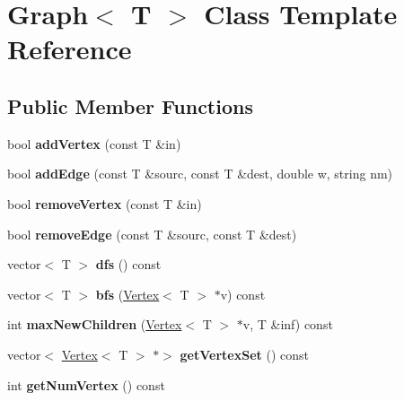 \hypertarget{class_graph}{}\section{Graph$<$ T $>$ Class Template Reference}
\label{class_graph}
\subsection*{Public Member Functions}
\begin{DoxyCompactItemize}
\item 
\hypertarget{class_graph_a00be284ea2be3b3d0f0d2e493b70245b}{}\label{class_graph_a00be284ea2be3b3d0f0d2e493b70245b} 
bool {\bfseries add\+Vertex} (const T \&in)
\item 
\hypertarget{class_graph_a09a8a2a77ce797e8be27364704a721ac}{}\label{class_graph_a09a8a2a77ce797e8be27364704a721ac} 
bool {\bfseries add\+Edge} (const T \&sourc, const T \&dest, double w, string nm)
\item 
\hypertarget{class_graph_af9c903104ad69a7782979fa9caedf163}{}\label{class_graph_af9c903104ad69a7782979fa9caedf163} 
bool {\bfseries remove\+Vertex} (const T \&in)
\item 
\hypertarget{class_graph_a1106092a37366486cf55576f9ec01692}{}\label{class_graph_a1106092a37366486cf55576f9ec01692} 
bool {\bfseries remove\+Edge} (const T \&sourc, const T \&dest)
\item 
\hypertarget{class_graph_a911798b1a89f8c4ae90ba3eee849cff8}{}\label{class_graph_a911798b1a89f8c4ae90ba3eee849cff8} 
vector$<$ T $>$ {\bfseries dfs} () const
\item 
\hypertarget{class_graph_a56a5ea2c3aa7c0bd3849849be404a631}{}\label{class_graph_a56a5ea2c3aa7c0bd3849849be404a631} 
vector$<$ T $>$ {\bfseries bfs} (\hyperlink{class_vertex}{Vertex}$<$ T $>$ $\ast$v) const
\item 
\hypertarget{class_graph_a675559f8cddfe43bc416023ad9f28cfa}{}\label{class_graph_a675559f8cddfe43bc416023ad9f28cfa} 
int {\bfseries max\+New\+Children} (\hyperlink{class_vertex}{Vertex}$<$ T $>$ $\ast$v, T \&inf) const
\item 
\hypertarget{class_graph_a135e8f915af85904abca9eafaa4f13ce}{}\label{class_graph_a135e8f915af85904abca9eafaa4f13ce} 
vector$<$ \hyperlink{class_vertex}{Vertex}$<$ T $>$ $\ast$$>$ {\bfseries get\+Vertex\+Set} () const
\item 
\hypertarget{class_graph_a0853eac15cdf0f06d63f4b8a7820ec71}{}\label{class_graph_a0853eac15cdf0f06d63f4b8a7820ec71} 
int {\bfseries get\+Num\+Vertex} () const
$$
\end{DoxyCompactItemize}
